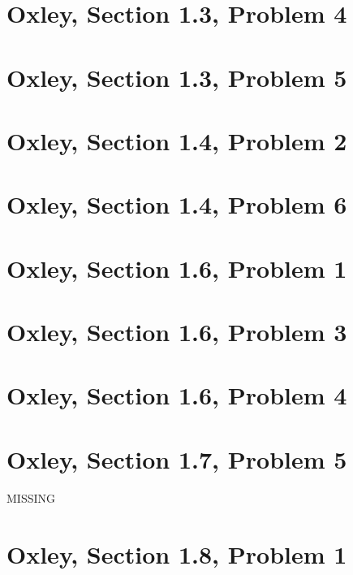     \section{Oxley, Section 1.3, Problem 4}
        
        \clearpage

    \section{Oxley, Section 1.3, Problem 5}
        
        \clearpage

    \section{Oxley, Section 1.4, Problem 2}
        
        \clearpage

    \section{Oxley, Section 1.4, Problem 6}
        
        \clearpage

    \section{Oxley, Section 1.6, Problem 1}
        
        \clearpage

    \section{Oxley, Section 1.6, Problem 3}
        
        \clearpage

    \section{Oxley, Section 1.6, Problem 4}
        
        \clearpage

    \section{Oxley, Section 1.7, Problem 5}
        MISSING
				
        \clearpage

    \section{Oxley, Section 1.8, Problem 1}
        
        \clearpage

